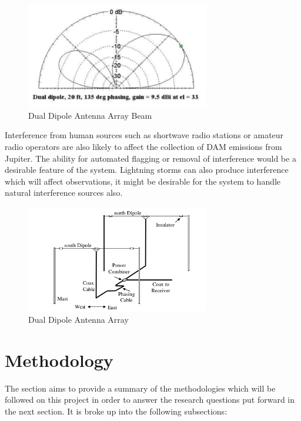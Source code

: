 \documentclass[runningheads,a4paper]{llncs}
\begin{document}
%
\begin{figure}[here]
\centering
\includegraphics[width=8cm]{images/09}
\caption{Dual Dipole Antenna Array Beam\citep{nasa12}}
\label{fig:dual_dipole_antenna_array_beam}
\end{figure}
%

Interference from human sources such as shortwave radio stations or amateur radio operators are also likely to affect the collection of \gls{DAM} emissions from Jupiter. The ability for automated flagging or removal of interference would be a desirable feature of the system. Lightning storms can also produce interference which will affect observations, it might be desirable for the system to handle natural interference sources also.

%
\begin{figure}[here]
\centering
\includegraphics[width=8cm]{images/08}
\caption{Dual Dipole Antenna Array \citep{nasa12}}
\label{fig:dual_dipole_antenna_array}
\end{figure}
%

\newpage
\section*{Methodology}
The section aims to provide a summary of the methodologies which will be followed on this project in order to answer the research questions put forward in the next section. It is broke up into the following subsections:
\end{document}
